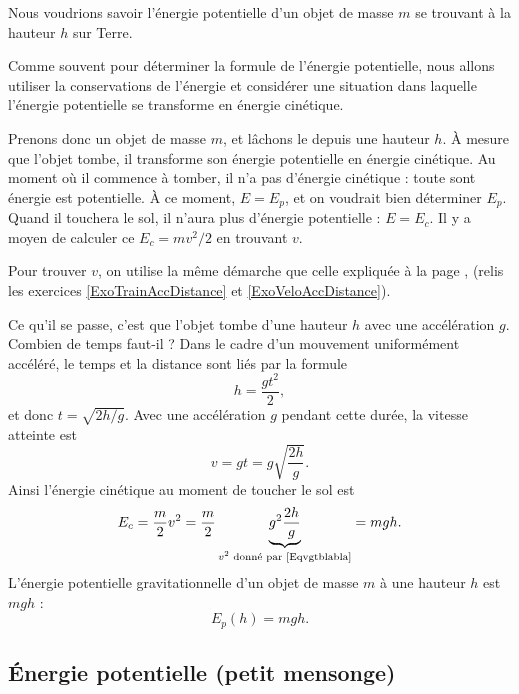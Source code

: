 Nous voudrions savoir l'énergie potentielle d'un objet de masse $m$ se trouvant à la hauteur $h$ sur Terre.

\begin{idee}
Comme souvent pour déterminer la formule de l'énergie potentielle, nous allons utiliser la conservations  de l'énergie et considérer une situation dans laquelle l'énergie potentielle se transforme en énergie cinétique. 
\end{idee}


Prenons donc un objet de masse $m$, et lâchons le depuis une hauteur $h$. À mesure que l'objet tombe, il transforme son énergie potentielle en énergie cinétique. Au moment où il commence à tomber, il n'a pas d'énergie cinétique : toute sont énergie est potentielle. À ce moment, $E=E_p$, et on voudrait bien déterminer $E_p$. Quand il touchera le sol, il n'aura plus d'énergie potentielle : $E=E_c$. Il y a moyen de calculer ce $E_c=mv^2/2$ en trouvant $v$.

Pour trouver $v$, on utilise la même démarche que celle expliquée à la page \pageref{PgPourquoiAccDeDistance}, (relis les exercices \ref{ExoTrainAccDistance} et \ref{ExoVeloAccDistance}).

Ce qu'il se passe, c'est que l'objet tombe d'une hauteur $h$ avec une accélération $g$. Combien de temps faut-il ? Dans le cadre d'un mouvement uniformément accéléré, le temps et la distance sont liés par la formule
\[
  h=\frac{gt^2}{2},
\]
et donc $t=\sqrt{2h/g}$. Avec une accélération $g$ pendant cette durée, la vitesse atteinte est 
\begin{equation}		\label{Eqvgtblabla}
	v=gt=g\sqrt{\frac{2h}{g}}.
\end{equation}
Ainsi l'énergie cinétique au moment de toucher le sol est
\[
E_c=\frac{ m }{ 2 }v^2=\frac{m}{2}\underbrace{ g^2\frac{2h}{g}}_{\text{$v^2$ donné par \eqref{Eqvgtblabla}}}=mgh.
\]
L'énergie potentielle gravitationnelle d'un objet de masse $m$ à une hauteur $h$ est $mgh$ :
\begin{equation}
	E_p(h)=mgh.
\end{equation}

\subsection{Énergie potentielle (petit mensonge)}

